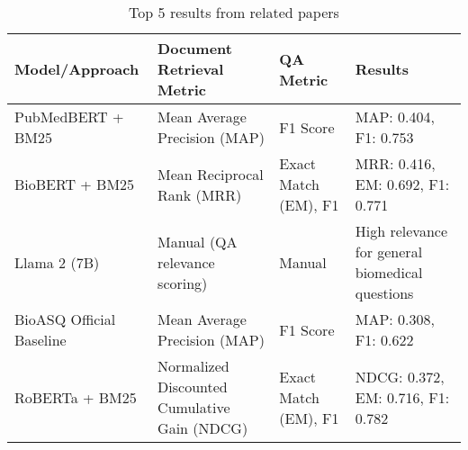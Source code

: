 \documentclass{article}
\begin{document}
\begin{table}[]
\scriptsize
    \begin{tabular}{|p{2cm}|p{4cm}|p{2cm}|p{3cm}|}
        \hline
        Model/Approach & Document Retrieval Metric & QA Metric & Results \\
        \hline
        \hline
        PubMedBERT + BM25 \cite{gu_domain-specific_2021} & Mean Average Precision (MAP) & F1 Score & MAP: 0.404, F1: 0.753\\
        \hline
        BioBERT + BM25 \cite{lee_biobert_2019} & Mean Reciprocal Rank (MRR) & Exact Match (EM), F1 & MRR: 0.416, EM: 0.692, F1: 0.771\\
        \hline
        Llama 2 (7B) \cite{tran_bioinstruct_2024} & Manual (QA relevance scoring)  & Manual & High relevance for general biomedical questions\\
        \hline
        BioASQ Official Baseline \cite{krithara_bioasq_2024} & Mean Average Precision (MAP) & F1 Score & MAP: 0.308, F1: 0.622\\
        \hline
        RoBERTa + BM25 \cite{noauthor_somosnlp-hackathon-2022roberta-base-biomedical-es-squad2-es_2024} & Normalized Discounted Cumulative Gain (NDCG) & Exact Match (EM), F1 & NDCG: 0.372, EM: 0.716, F1: 0.782\\
        \hline
    \end{tabular}
    \caption{Top 5 results from related papers}
    \label{tab:my_label}
\end{table}
\end{document}
